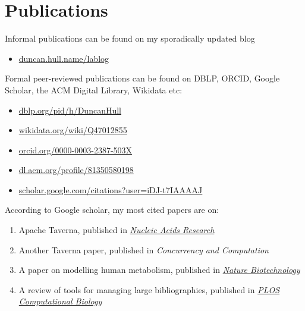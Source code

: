 \documentclass[
  12pt,
]{book}
\providecommand{\tightlist}{%
  \setlength{\itemsep}{0pt}\setlength{\parskip}{0pt}}
\begin{document}
\hypertarget{publications}{%
\section{Publications}\label{publications}}

Informal publications can be found on my sporadically updated blog

\begin{itemize}
\tightlist
\item
  \href{https://duncan.hull.name/lablog/}{duncan.hull.name/lablog}
\end{itemize}

Formal peer-reviewed publications can be found on DBLP, ORCID, Google Scholar, the ACM Digital Library, Wikidata etc:

\begin{itemize}
\tightlist
\item
  \href{https://dblp.org/pid/h/DuncanHull}{dblp.org/pid/h/DuncanHull}
\item
  \href{https://www.wikidata.org/wiki/Q47012855}{wikidata.org/wiki/Q47012855}
\item
  \href{https://orcid.org/0000-0003-2387-503X}{orcid.org/0000-0003-2387-503X}
\item
  \href{https://dl.acm.org/profile/81350580198}{dl.acm.org/profile/81350580198}
\item
  \href{https://scholar.google.com/citations?user=iDJ-t7IAAAAJ}{scholar.google.com/citations?user=iDJ-t7IAAAAJ}
\end{itemize}

According to Google scholar, my most cited papers are on:

\begin{enumerate}
\def\labelenumi{\arabic{enumi}.}
\tightlist
\item
  Apache Taverna, published in \href{https://en.wikipedia.org/wiki/Nucleic_Acids_Research}{\emph{Nucleic Acids Research}} \citep{taverna}\\
\item
  Another Taverna paper, published in \emph{Concurrency and Computation} \citep{Oinn2006}\\
\item
  A paper on modelling human metabolism, published in \href{https://en.wikipedia.org/wiki/Nature_Biotechnology}{\emph{Nature Biotechnology}} \citep{Thiele2013}
\item
  A review of tools for managing large bibliographies, published in \href{https://en.wikipedia.org/wiki/PLOS_Computational_Biology}{\emph{PLOS Computational Biology}} \citep{defrosting}
\end{enumerate}
\end{document}
